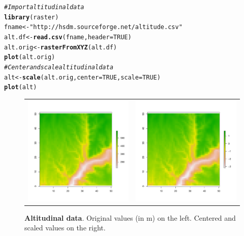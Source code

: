 \documentclass[a4paper, 12pt, leqno]{article}\usepackage[]{graphicx}\usepackage[]{color}
\makeatletter
\newcommand{\hlnum}[1]{\textcolor[rgb]{0.686,0.059,0.569}{#1}}%
\newcommand{\hlstr}[1]{\textcolor[rgb]{0.192,0.494,0.8}{#1}}%
\newcommand{\hlcom}[1]{\textcolor[rgb]{0.678,0.584,0.686}{\textit{#1}}}%
\newcommand{\hlstd}[1]{\textcolor[rgb]{0.345,0.345,0.345}{#1}}%
\newcommand{\hlkwb}[1]{\textcolor[rgb]{0.69,0.353,0.396}{#1}}%
\newcommand{\hlkwc}[1]{\textcolor[rgb]{0.333,0.667,0.333}{#1}}%
\newcommand{\hlkwd}[1]{\textcolor[rgb]{0.737,0.353,0.396}{\textbf{#1}}}%
\newenvironment{kframe}{%
 \def\at@end@of@kframe{}%
 \ifinner\ifhmode%
  \def\at@end@of@kframe{\end{minipage}}%
  \begin{minipage}{\columnwidth}%
 \fi\fi%
 \def\FrameCommand##1{\hskip\@totalleftmargin \hskip-\fboxsep
 \colorbox{shadecolor}{##1}\hskip-\fboxsep
     \hskip-\linewidth \hskip-\@totalleftmargin \hskip\columnwidth}%
 \MakeFramed {\advance\hsize-\width
   \@totalleftmargin\z@ \linewidth\hsize
   \@setminipage}}%
 {\par\unskip\endMakeFramed%
 \at@end@of@kframe}
\newenvironment{knitrout}{}{} %
\makeatother
\begin{document}
\begin{knitrout}\small
{}\color{fgcolor}\begin{kframe}
\begin{alltt}
\hlcom{# Import altitudinal data}
\hlkwd{library}\hlstd{(raster)}
\hlstd{fname} \hlkwb{<-} \hlstr{"http://hsdm.sourceforge.net/altitude.csv"}
\hlstd{alt.df} \hlkwb{<-} \hlkwd{read.csv}\hlstd{(fname,}\hlkwc{header}\hlstd{=}\hlnum{TRUE}\hlstd{)}
\hlstd{alt.orig} \hlkwb{<-} \hlkwd{rasterFromXYZ}\hlstd{(alt.df)}
\hlkwd{plot}\hlstd{(alt.orig)}
\hlcom{# Center and scale altitudinal data}
\hlstd{alt} \hlkwb{<-} \hlkwd{scale}\hlstd{(alt.orig,}\hlkwc{center}\hlstd{=}\hlnum{TRUE}\hlstd{,}\hlkwc{scale}\hlstd{=}\hlnum{TRUE}\hlstd{)}
\hlkwd{plot}\hlstd{(alt)}
\end{alltt}
\end{kframe}
\end{knitrout}


\begin{figure}[!h] 
  \begin{tabular}{cc}
    \includegraphics[width=8cm]{figures/Altitude1.pdf} &
    \includegraphics[width=8cm]{figures/Altitude2.pdf} \\
  \end{tabular}
  \caption{\textbf{Altitudinal data}. Original values (in m) on the left. Centered and
    scaled values on the right.}
  \label{fig:Altitude}
\end{figure}
\end{document}

